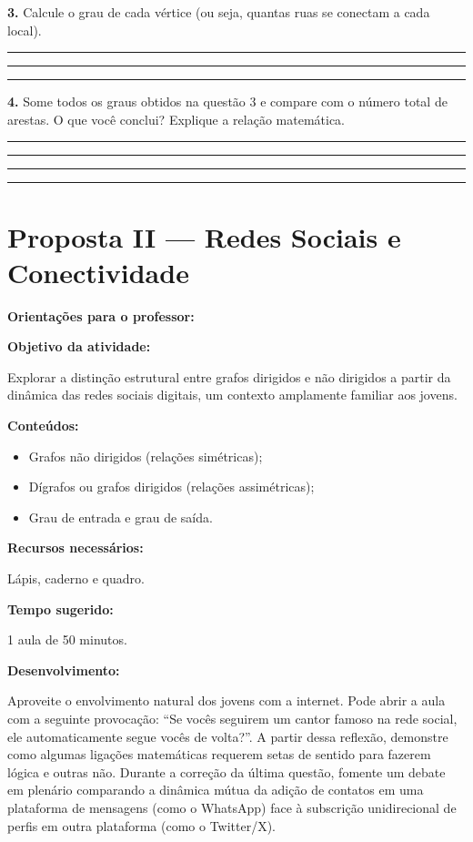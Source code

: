 \documentclass[
  12pt,
  oneside,
  a4paper,
  english,
  brazilian
  ]{abntex2}
\theoremstyle{definition}
\def\vspace#1{ }%
\begin{document}
\begin{apendicesenv}
\textbf{3.} Calcule o grau de cada vértice (ou seja, quantas ruas se conectam a cada local).

\vspace{0.3cm}
\noindent\rule{\textwidth}{0.4pt}\vspace{0.3cm}
\noindent\rule{\textwidth}{0.4pt}\vspace{0.3cm}
\noindent\rule{\textwidth}{0.4pt}

\textbf{4.} Some todos os graus obtidos na questão 3 e compare com o número total de arestas. O que você conclui? Explique a relação matemática.

\vspace{0.3cm}
\noindent\rule{\textwidth}{0.4pt}\vspace{0.3cm}
\noindent\rule{\textwidth}{0.4pt}\vspace{0.3cm}
\noindent\rule{\textwidth}{0.4pt}\vspace{0.3cm}
\noindent\rule{\textwidth}{0.4pt}


\chapter{Proposta II --- Redes Sociais e Conectividade}
\label{apendice:redes}

\textbf{Orientações para o professor:}

\textbf{Objetivo da atividade:}

Explorar a distinção estrutural entre grafos dirigidos e não dirigidos a partir da dinâmica das redes sociais digitais, um contexto amplamente familiar aos jovens.

\textbf{Conteúdos:}

\begin{itemize}[noitemsep]
  \item Grafos não dirigidos (relações simétricas);
  \item Dígrafos ou grafos dirigidos (relações assimétricas);
  \item Grau de entrada e grau de saída.
\end{itemize}

\textbf{Recursos necessários:}

Lápis, caderno e quadro.

\textbf{Tempo sugerido:}

1 aula de 50 minutos.

\textbf{Desenvolvimento:}

Aproveite o envolvimento natural dos jovens com a internet. Pode abrir a aula com a seguinte provocação: ``Se vocês seguirem um cantor famoso na rede social, ele automaticamente segue vocês de volta?''. A partir dessa reflexão, demonstre como algumas ligações matemáticas requerem setas de sentido para fazerem lógica e outras não. Durante a correção da última questão, fomente um debate em plenário comparando a dinâmica mútua da adição de contatos em uma plataforma de mensagens (como o WhatsApp) face à subscrição unidirecional de perfis em outra plataforma (como o Twitter/X).


\end{apendicesenv}
\end{document}
